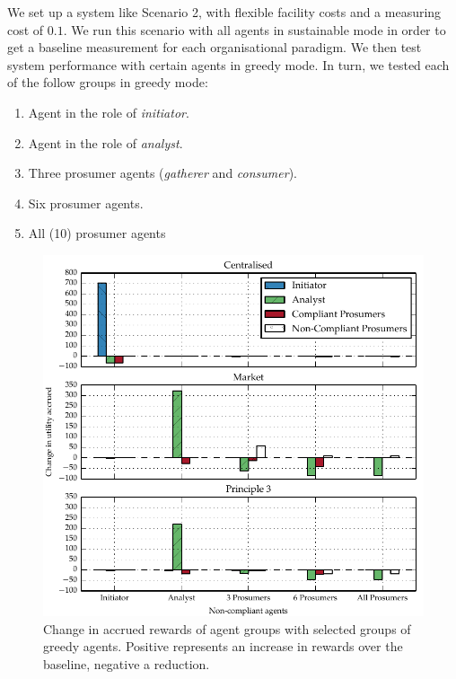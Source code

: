 We set up a system like Scenario 2, with flexible facility costs and a
measuring cost of $0.1$. We run this scenario with all agents in sustainable
mode in order to get a baseline measurement for each organisational paradigm.
We then test system performance with certain agents in greedy mode.
In turn, we tested each of the follow groups in greedy mode:

\begin{enumerate}
\item Agent in the role of \emph{initiator}.
\item Agent in the role of \emph{analyst}.
\item Three prosumer agents (\emph{gatherer} and \emph{consumer}).
\item Six prosumer agents.
\item All (10) prosumer agents
\end{enumerate}

\begin{figure}
\includegraphics{gfx/kc/powerbar.pdf} 
\caption[Change in accrued rewards of agent groups with selected groups of greedy agents.]{Change in accrued rewards of agent groups with selected groups of greedy agents. Positive represents an increase in rewards over the baseline, negative a reduction.}\label{fig:powerbar}
\end{figure}

